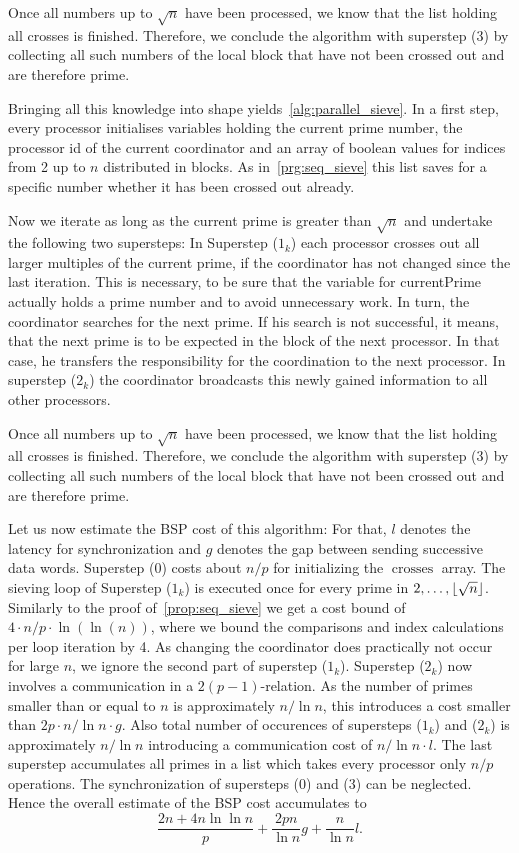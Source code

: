 \documentclass[a4paper,12pt]{article}
\DeclarePairedDelimiter\floor{\lfloor}{\rfloor}
\DeclareMathOperator{\crosses}{crosses}
\begin{document}
Once all numbers up to $\sqrt{n}$ have been processed, we know that the list holding all crosses is finished.
Therefore, we conclude the algorithm with superstep ($3$) by collecting all such numbers of the local block that have not been crossed out and are therefore prime.



Bringing all this knowledge into shape yields~\autoref{alg:parallel_sieve}.
In a first step, every processor initialises variables holding the current prime number, the processor id of the current coordinator and an array of boolean values for indices from 2 up to $n$ distributed in blocks.
As in~\autoref{prg:seq_sieve} this list saves for a specific number whether it has been crossed out already.

Now we iterate as long as the current prime is greater than $\sqrt{n}$ and undertake the following two supersteps:
In Superstep ($1_k$) each processor crosses out all larger multiples of the current prime, if the coordinator has not changed since the last iteration.
This is necessary, to be sure that the variable for currentPrime actually holds a prime number and to avoid unnecessary work.
In turn, the coordinator searches for the next prime.
If his search is not successful, it means, that the next prime is to be expected in the block of the next processor.
In that case, he transfers the responsibility for the coordination to the next processor.
In superstep ($2_k$) the coordinator broadcasts this newly gained information to all other processors.
 
Once all numbers up to $\sqrt{n}$ have been processed, we know that the list holding all crosses is finished.
Therefore, we conclude the algorithm with superstep ($3$) by collecting all such numbers of the local block that have not been crossed out and are therefore prime.

Let us now estimate the BSP cost of this algorithm:
For that, $l$ denotes the latency for synchronization and $g$ denotes the gap between sending successive data words.
Superstep ($0$) costs about $n/p$ for initializing the $\crosses$ array.
The sieving loop of Superstep ($1_k$) is executed once for every prime in $2,\dots,\floor{\sqrt{n}}$.
Similarly to the proof of~\autoref{prop:seq_sieve} we get a cost bound of $4\cdot n/p \cdot \ln(\ln(n))$, where we bound the comparisons and index calculations per loop iteration by 4.
As changing the coordinator does practically not occur for large $n$, we ignore the second part of superstep ($1_k$).
Superstep ($2_k$) now involves a communication in a $2(p-1)$-relation.
As the number of primes smaller than or equal to $n$ is approximately $n/\ln n$, this introduces a cost smaller than $2p\cdot n/\ln n\cdot g$.
Also total number of occurences of supersteps ($1_k$) and ($2_k$) is approximately  $n/\ln n$ introducing a communication cost of $n/\ln n \cdot l$.
The last superstep accumulates all primes in a list which takes every processor only $n/p$ operations.
The synchronization of supersteps ($0$) and ($3$) can be neglected.
Hence the overall estimate of the BSP cost accumulates to
\[
	\frac{2n + 4n \ln \ln n}{p} + \frac{2p n}{\ln n}g + \frac{n}{\ln n} l.
\]
\end{document}

